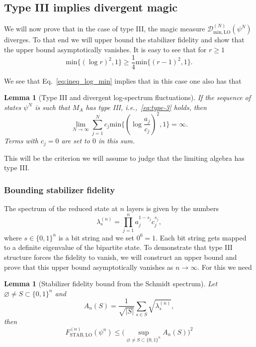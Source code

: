 \documentclass[aps,pra,reprint,superscriptaddress]{revtex4-2}
\newcommand{\cD}{{\mathcal D}}
\renewcommand\l{\lambda}
\newtheorem{lemma}[theorem]{Lemma}
\theoremstyle{definition}
\theoremstyle{remark}
\begin{document}
\subsection{Type III implies divergent magic}
We will now prove that in the case of type III, the magic measure $\cD^{(N)}_{\mathrm{min,LO}}(\psi^N)$ diverges. To that end we will upper bound the stabilizer fidelity and show that the upper bound asymptotically vanishes. 
It is easy to see that for $r \geq 1$ 
\begin{equation}\label{eq:ineq_log_min}
    \mathrm{min}\{(\log r)^2,1 \} \geq \frac{1}{4} \mathrm{min}\{(r-1)^2, 1\}.
\end{equation}

    We see that Eq.~\eqref{eq:ineq_log_min} implies that in this case one also
    has that 
    \begin{lemma}[Type III and divergent log-spectrum fluctuations] If the sequence of states $\psi^N$ is such that $M_A$ has type III, i.e.,~\eqref{eq:type-3} holds, then
        \begin{equation}\label{eq:divergent_fluctuations}
           \lim_{N \rightarrow \infty} \sum_{j = 1}^{N} c_j \mathrm{min}\{(\log
           \frac{a_j}{c_j})^2,1 \} = \infty.
        \end{equation}
        Terms with $c_j = 0$ are set to $0$ in this sum.
    \end{lemma}
    This will be the criterion we will assume to judge that the limiting algebra has type III.

\subsubsection{Bounding stabilizer fidelity}
    The spectrum of the reduced state at $n$ layers is given by the numbers 
    \begin{equation}\label{eq:lambda_s_l}
        \l_s^{(n)} = \prod_{j=1}^{n} a_j^{1-s_j} c_j^{s_j},
    \end{equation}
    where $s \in \{0,1\}^n$ is a bit string and we set $0^0=1$. Each bit string gets mapped to
    a definite eigenvalue of the bipartite state. To demonstrate
    that type III structure forces the fidelity to vanish, we will construct an
    upper bound and prove that this upper bound asymptotically vanishes as $n
    \rightarrow \infty$. For this we need
    
    \begin{lemma}[Stabilizer fidelity bound from the Schmidt spectrum]
        Let $\varnothing\neq S \subset \{0,1\}^{n}$ and 
        \begin{equation}
            A_n(S) = \frac{1}{\sqrt{|S|}} \sum_{s\in S} \sqrt{\l^{(n)}_{s}},
        \end{equation}
        then
        \begin{equation}\label{eq:F_leq_A}
            F_{\mathrm{STAB},\mathrm{LO}}^{(n)}(\psi^n) \leq \big(\sup_{\varnothing\neq S\subset \{0,1 \}^n}
            A_n(S)\big)^2
        \end{equation}
    \end{lemma}
    
\end{document}
